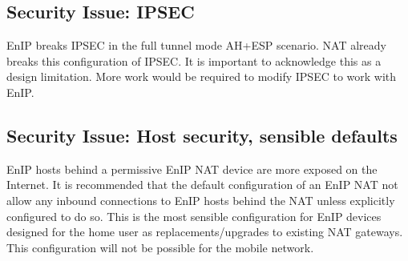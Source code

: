 \subsection{Security Issue: IPSEC}
EnIP breaks IPSEC in the full tunnel mode AH+ESP scenario.  NAT
already breaks this configuration of IPSEC. It is important to acknowledge this as a design limitation.  More work would be required to
modify IPSEC to work with EnIP.  

\subsection{Security Issue: Host security, sensible defaults}
EnIP hosts behind a permissive EnIP NAT device are more exposed on the Internet.  It is recommended that the default configuration
of an EnIP NAT not allow any inbound connections to EnIP hosts behind the NAT unless explicitly configured to do so.  This is the most sensible configuration
for EnIP devices designed for the home user as replacements/upgrades to existing NAT gateways.  This configuration will not be possible for the
mobile network.

%
